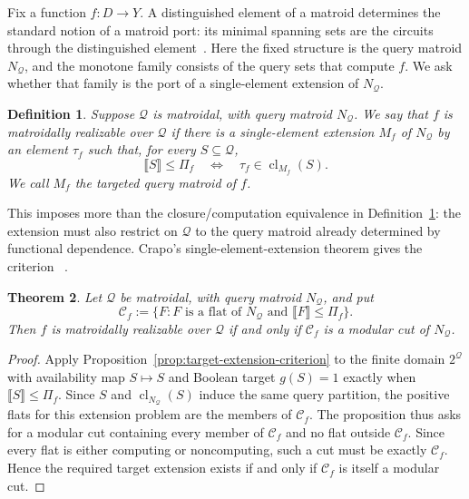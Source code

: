 \documentclass[11pt]{article}
\numberwithin{equation}{section}
\newtheorem{definition}{Definition}[section]
\newtheorem{theorem}[definition]{Theorem}
\theoremstyle{remark}
\newcommand{\cl}{\operatorname{cl}}
\begin{document}
Fix a function $f:D\to Y$. A distinguished element of a matroid determines
the standard notion of a matroid port: its minimal spanning sets are the
circuits through the distinguished element~\cite{Lehman1964,Seymour1976Ports}.
Here the fixed structure is the query matroid $N_{\mathcal Q}$, and the
monotone family consists of the query sets that compute $f$. We ask whether
that family is the port of a single-element extension of $N_{\mathcal Q}$.
\begin{definition}
\label{def:target-query-matroid}
Suppose $\mathcal Q$ is matroidal, with query matroid $N_{\mathcal Q}$. We
say that $f$ is \emph{matroidally realizable over $\mathcal Q$} if there is a
single-element extension $M_f$ of $N_{\mathcal Q}$ by an element $\tau_f$
such that, for every $S\subseteq\mathcal Q$,
\begin{equation}
    \llbracket S\rrbracket\leq\Pi_f
    \quad\Longleftrightarrow\quad
    \tau_f\in\cl_{M_f}(S).
\end{equation}
We call $M_f$ the \emph{targeted query matroid} of $f$.
\end{definition}

This imposes more than the closure/computation equivalence in
Definition~\ref{def:target-query-matroid}: the extension must also restrict
on $\mathcal Q$ to the query matroid already determined by functional
dependence. Crapo's single-element-extension theorem gives the criterion
~\cite{Crapo1965}.

\begin{theorem}
\label{thm:target-modular-cut}
Let $\mathcal Q$ be matroidal, with query matroid $N_{\mathcal Q}$, and put
\begin{equation}
    \mathcal C_f
    :=
    \{F:F\text{ is a flat of }N_{\mathcal Q}
    \text{ and }\llbracket F\rrbracket\leq\Pi_f\}.
\end{equation}
Then $f$ is matroidally realizable over $\mathcal Q$ if and only if
$\mathcal C_f$ is a modular cut of $N_{\mathcal Q}$.
\end{theorem}

\begin{proof}
Apply Proposition~\ref{prop:target-extension-criterion} to the finite domain
$2^{\mathcal Q}$ with availability map $S\mapsto S$ and Boolean target
$g(S)=1$ exactly when $\llbracket S\rrbracket\leq\Pi_f$. Since $S$ and
$\cl_{N_{\mathcal Q}}(S)$ induce the same query partition, the positive flats
for this extension problem are the members of $\mathcal C_f$.
The proposition thus asks for a modular cut containing every member of
$\mathcal C_f$ and no flat outside $\mathcal C_f$. Since every flat is either
computing or noncomputing, such a cut must be exactly $\mathcal C_f$.
Hence the required target extension exists if and only if $\mathcal C_f$ is
itself a modular cut.
\end{proof}
\end{document}
